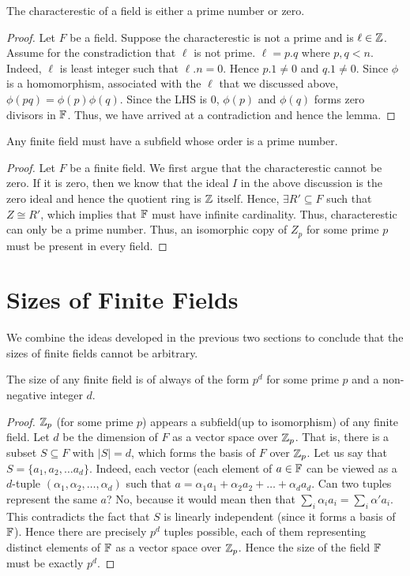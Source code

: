 \begin{lemma}
The characterestic of a field is either a prime number or zero.
\end{lemma}
\begin{proof}
Let $F$ be a field. Suppose the characterestic is not a prime and is $\ell \in {\mathbb{Z}}$. Assume for the constradiction that $\ell$ is not prime. $\ell = p.q$ where $p, q < n$. Indeed, $\ell$ is least integer such that $\ell.n = 0$. Hence $p.1 \ne 0$ and $q.1 \ne 0$. Since $\phi$ is a homomorphism, associated with the $\ell$ that we discussed above, $\phi(pq) = \phi(p)\phi(q)$. Since the LHS is $0$, $\phi(p)$ and $\phi(q)$ forms zero divisors in ${\mathbb{F}}$. Thus, we have arrived at a contradiction and hence the lemma.
\end{proof}

\begin{corollary}
Any finite field must have a subfield whose order is a prime number.
\end{corollary}
\begin{proof}
Let $F$ be a finite field. We first argue that the characterestic cannot be zero. If it is zero, then we know that the ideal $I$ in the above discussion is the zero ideal and hence the quotient ring is ${\mathbb{Z}}$ itself.
Hence, $\exists R' \subseteq F$ such that $Z \cong R'$, which implies that ${\mathbb{F}}$ must have infinite cardinality. Thus, characterestic can only be a prime number. Thus, an isomorphic copy of $Z_p$ for some prime $p$ must be present in every field.
\end{proof}

\section{Sizes of Finite Fields}

We combine the ideas developed in the previous two sections to conclude that the sizes of finite fields cannot be arbitrary.

\begin{lemma}
The size of any finite field is of always of the form $p^d$ for some prime $p$ and a non-negative integer $d$.
\end{lemma}
\begin{proof}
${\mathbb{Z}}_p$ (for some prime $p$) appears a subfield(up to isomorphism) of any finite field. Let $d$ be the dimension of $F$ as a vector space over ${\mathbb{Z}}_p$. That is, there is a subset $S \subseteq F$ with $|S| = d$, which forms the basis of $F$ over ${\mathbb{Z}}_p$. Let us say that $S = \{ a_1, a_2, \ldots a_d \}$. Indeed, each vector (each element of $a \in {\mathbb{F}}$ can be viewed as a $d$-tuple $(\alpha_1, \alpha_2, \ldots, \alpha_d)$ such that $a = \alpha_1a_1 + \alpha_2a_2 + \ldots + \alpha_d a_d$. Can two tuples represent the same $a$? No, because it would mean then that $\sum_i \alpha_i a_i = \sum_i \alpha' a_i$. This contradicts the fact that $S$ is linearly independent (since it forms a basis of ${\mathbb{F}}$). Hence there are precisely $p^d$ tuples possible, each of them representing distinct elements of ${\mathbb{F}}$ as a vector space over ${\mathbb{Z}}_p$. Hence the size of the field ${\mathbb{F}}$ must be exactly $p^d$.
\end{proof}

